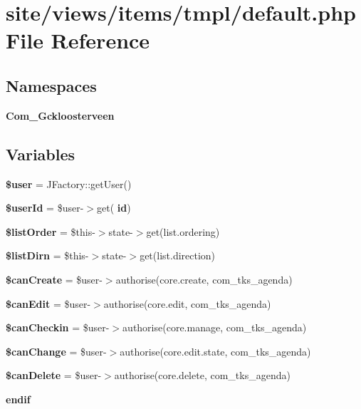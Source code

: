\section{site/views/items/tmpl/default.php File Reference}
\label{site_2views_2items_2tmpl_2default_8php}
\subsection*{Namespaces}
\begin{DoxyCompactItemize}
\item 
 \textbf{ Com\+\_\+\+Gckloosterveen}
\end{DoxyCompactItemize}
\subsection*{Variables}
\begin{DoxyCompactItemize}
\item 
\textbf{ \$user} = J\+Factory\+::get\+User()
\item 
\textbf{ \$user\+Id} = \$user-\/$>$get(\textquotesingle{}\textbf{ id}\textquotesingle{})
\item 
\textbf{ \$list\+Order} = \$this-\/$>$state-\/$>$get(\textquotesingle{}list.\+ordering\textquotesingle{})
\item 
\textbf{ \$list\+Dirn} = \$this-\/$>$state-\/$>$get(\textquotesingle{}list.\+direction\textquotesingle{})
\item 
\textbf{ \$can\+Create} = \$user-\/$>$authorise(\textquotesingle{}core.\+create\textquotesingle{}, \textquotesingle{}com\+\_\+tks\+\_\+agenda\textquotesingle{})
\item 
\textbf{ \$can\+Edit} = \$user-\/$>$authorise(\textquotesingle{}core.\+edit\textquotesingle{}, \textquotesingle{}com\+\_\+tks\+\_\+agenda\textquotesingle{})
\item 
\textbf{ \$can\+Checkin} = \$user-\/$>$authorise(\textquotesingle{}core.\+manage\textquotesingle{}, \textquotesingle{}com\+\_\+tks\+\_\+agenda\textquotesingle{})
\item 
\textbf{ \$can\+Change} = \$user-\/$>$authorise(\textquotesingle{}core.\+edit.\+state\textquotesingle{}, \textquotesingle{}com\+\_\+tks\+\_\+agenda\textquotesingle{})
\item 
\textbf{ \$can\+Delete} = \$user-\/$>$authorise(\textquotesingle{}core.\+delete\textquotesingle{}, \textquotesingle{}com\+\_\+tks\+\_\+agenda\textquotesingle{})
\item 
\textbf{ endif}
\end{DoxyCompactItemize}


